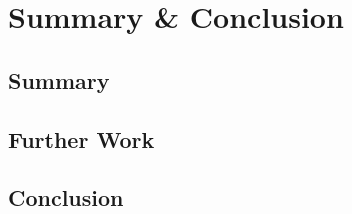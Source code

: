 \chapter{Summary \& Conclusion \label{chap:conclusion}}
  \section{Summary}
  \section{Further Work}
  \section{Conclusion}
